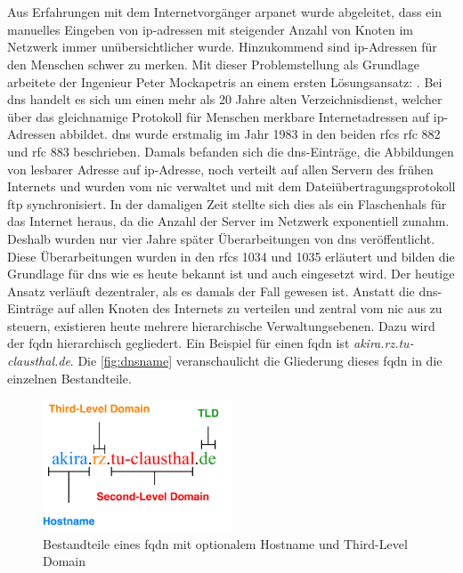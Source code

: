 \documentclass[titlepage]{report}
\begin{document}
\section*{}
Aus Erfahrungen mit dem Internetvorgänger \gls{arpanet} wurde
abgeleitet, dass ein manuelles Eingeben von \gls{ip}\hyp{}adressen mit
steigender Anzahl von Knoten im Netzwerk immer unübersichtlicher wurde.
Hinzukommend sind \gls{ip}\hyp{}Adressen für den Menschen schwer zu
merken. Mit dieser Problemstellung als Grundlage arbeitete der Ingenieur
Peter Mockapetris an einem ersten Lösungsansatz: .
Bei \gls{dns} handelt es sich um einen mehr als 20 Jahre alten
Verzeichnisdienst, welcher über das gleichnamige Protokoll für Menschen
merkbare Internetadressen auf \gls{ip}\hyp{}Adressen abbildet.
\gls{dns} wurde erstmalig im Jahr 1983 in den beiden \glspl{rfc}
\gls{rfc} 882\cite{RFC0882} und \gls{rfc} 883\cite{RFC0883} beschrieben.
Damals befanden sich die \gls{dns}\hyp{}Einträge, die Abbildungen von
lesbarer Adresse auf \gls{ip}\hyp{}Adresse, noch verteilt auf
allen Servern des frühen Internets und wurden vom \gls{nic} verwaltet
und mit dem Dateiübertragungsprotokoll \gls{ftp}
synchronisiert\cite{RFC1034}. In der damaligen Zeit stellte sich dies
als ein Flaschenhals für das Internet heraus, da die Anzahl der Server
im Netzwerk exponentiell zunahm. Deshalb wurden nur vier Jahre später
Überarbeitungen von \gls{dns} veröffentlicht. Diese Überarbeitungen
wurden in den \glspl{rfc} 1034 und 1035 erläutert
und bilden die Grundlage für \gls{dns} wie es heute bekannt ist und auch
eingesetzt wird. Der heutige Ansatz verläuft dezentraler, als es damals
der Fall gewesen ist. Anstatt die \gls{dns}\hyp{}Einträge auf allen
Knoten des Internets zu verteilen und zentral vom \gls{nic} aus zu
steuern, existieren heute mehrere hierarchische Verwaltungsebenen. Dazu
wird der \gls{fqdn} hierarchisch gegliedert. Ein Beispiel für einen
\gls{fqdn} ist \emph{akira.rz.tu-clausthal.de}. Die
\autoref{fig:dnsname} veranschaulicht die Gliederung dieses \gls{fqdn} in die
einzelnen Bestandteile.
\begin{figure}[H]
    \centering
    \includegraphics[width=0.5\textwidth]{figures/dnsname.pdf}
    \caption{Bestandteile eines \gls{fqdn} mit optionalem Hostname und Third-Level
    Domain}\label{fig:dnsname}
\end{figure}
\end{document}
